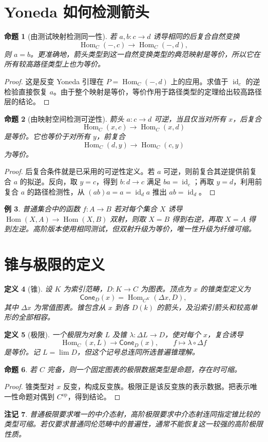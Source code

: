 \documentclass[12pt,oneside,openany,fontset=none]{ctexbook}
\theoremstyle{cn}
\newtheorem{definition}{定义}[chapter]
\newtheorem{example}[definition]{例}
\newtheorem{proposition}[definition]{命题}
\newtheorem{remark}[definition]{注记}
\numberwithin{equation}{chapter}
\newcommand{\id}{\operatorname{id}}
\newcommand{\Hom}{\operatorname{Hom}}
\newcommand{\op}{\mathrm{op}}
\newcommand{\limm}{\operatorname*{lim}}
\begin{document}
\section{Yoneda 如何检测箭头}
\begin{proposition}[由测试映射检测同一性]
若 $a,b:c\to d$ 诱导相同的后复合自然变换
\[
\Hom_C(-,c)\longrightarrow\Hom_C(-,d),
\]
则 $a=b$。更准确地，箭头类型到这一自然变换类型的典范映射是等价，所以它在所有较高路径类型上也为等价。
\end{proposition}
\begin{proof}
这是反变 Yoneda 引理在 $P=\Hom_C(-,d)$ 上的应用。求值于 $\id_c$ 的逆检验直接恢复 $a$。由于整个映射是等价，等价作用于路径类型的定理给出较高路径层的结论。
\end{proof}
\begin{proposition}[由映射空间检测可逆性]
箭头 $a:c\to d$ 可逆，当且仅当对所有 $x$，后复合
\[
\Hom_C(x,c)\longrightarrow\Hom_C(x,d)
\]
是等价。它也等价于对所有 $y$，前复合
\[
\Hom_C(d,y)\longrightarrow\Hom_C(c,y)
\]
为等价。
\end{proposition}
\begin{proof}
后复合条件就是已采用的可逆性定义。若 $a$ 可逆，则前复合其逆提供前复合 $a$ 的拟逆。反向，取 $y=c$，得到 $b:d\to c$ 满足 $ba=\id_c$；再取 $y=d$，利用前复合 $a$ 的路径检测性，从 $(ab)a=a=\id_d a$ 推出 $ab=\id_d$。
\end{proof}
\begin{example}
普通集合中的函数 $f:A\to B$ 若对每个集合 $X$ 诱导 $\Hom(X,A)\to\Hom(X,B)$ 双射，则取 $X=B$ 得到右逆，再取 $X=A$ 得到左逆。高阶版本使用相同测试，但双射升级为等价，唯一性升级为纤维可缩。
\end{example}

\section{锥与极限的定义}
\begin{definition}[锥]
设 $K$ 为索引范畴，$D:K\to C$ 为图表。顶点为 $x$ 的锥类型定义为
\[
\mathsf{Cone}_D(x)=\Hom_{C^K}(\Delta x,D),
\]
其中 $\Delta x$ 为常值图表。锥包含从 $x$ 到各 $D(k)$ 的箭头，及沿索引箭头和较高单形的全部相容。
\end{definition}
\begin{definition}[极限]
一个极限为对象 $L$ 及锥 $\lambda:\Delta L\to D$，使对每个 $x$，复合诱导
\[
\Hom_C(x,L)\longrightarrow\mathsf{Cone}_D(x),
\qquad f\longmapsto\lambda\circ\Delta f
\]
是等价。记 $L=\limm D$，但这个记号总连同所选普遍锥理解。
\end{definition}
\begin{proposition}
若 $C$ 完备，则一个固定图表的极限数据类型是命题，存在时可缩。
\end{proposition}
\begin{proof}
锥类型对 $x$ 反变，构成反变族。极限正是该反变族的表示数据。把表示唯一性命题对偶到 $C^{\op}$，得到结论。
\end{proof}
\begin{remark}
普通极限要求唯一的中介态射，高阶极限要求中介态射连同指定锥比较的类型可缩。若仅要求普通同伦范畴中的普遍性，通常不能恢复这一较强的高阶极限性质。
\end{remark}
\end{document}
